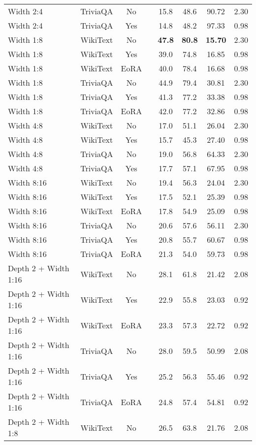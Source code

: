 \begin{longtable}{lcclcccc}
Width 2:4 & TriviaQA & No & & 15.8 & 48.6 & 90.72 & 2.30 \\
Width 2:4 & TriviaQA & Yes & & 14.8 & 48.2 & 97.33 & 0.98 \\
Width 1:8 & WikiText & No & & \textbf{47.8} & \textbf{80.8} & \textbf{15.70} & 2.30 \\
Width 1:8 & WikiText & Yes & & 39.0 & 74.8 & 16.85 & 0.98 \\
Width 1:8 & WikiText & EoRA & & 40.0 & 78.4 & 16.68 & 0.98 \\
Width 1:8 & TriviaQA & No & & 44.9 & 79.4 & 30.81 & 2.30 \\
Width 1:8 & TriviaQA & Yes & & 41.3 & 77.2 & 33.38 & 0.98 \\
Width 1:8 & TriviaQA & EoRA & & 42.0 & 77.2 & 32.86 & 0.98 \\
Width 4:8 & WikiText & No & & 17.0 & 51.1 & 26.04 & 2.30 \\
Width 4:8 & WikiText & Yes & & 15.7 & 45.3 & 27.40 & 0.98 \\
Width 4:8 & TriviaQA & No & & 19.0 & 56.8 & 64.33 & 2.30 \\
Width 4:8 & TriviaQA & Yes & & 17.7 & 57.1 & 67.95 & 0.98 \\
Width 8:16 & WikiText & No & & 19.4 & 56.3 & 24.04 & 2.30 \\
Width 8:16 & WikiText & Yes & & 17.5 & 52.1 & 25.39 & 0.98 \\
Width 8:16 & WikiText & EoRA & & 17.8 & 54.9 & 25.09 & 0.98 \\
Width 8:16 & TriviaQA & No & & 20.6 & 57.6 & 56.11 & 2.30 \\
Width 8:16 & TriviaQA & Yes & & 20.8 & 55.7 & 60.67 & 0.98 \\
Width 8:16 & TriviaQA & EoRA & & 21.3 & 54.0 & 59.73 & 0.98 \\
Depth 2 + Width 1:16 & WikiText & No & & 28.1 & 61.8 & 21.42 & 2.08 \\
Depth 2 + Width 1:16 & WikiText & Yes & & 22.9 & 55.8 & 23.03 & 0.92 \\
Depth 2 + Width 1:16 & WikiText & EoRA & & 23.3 & 57.3 & 22.72 & 0.92 \\
Depth 2 + Width 1:16 & TriviaQA & No & & 28.0 & 59.5 & 50.99 & 2.08 \\
Depth 2 + Width 1:16 & TriviaQA & Yes & & 25.2 & 56.3 & 55.46 & 0.92 \\
Depth 2 + Width 1:16 & TriviaQA & EoRA & & 24.8 & 57.4 & 54.81 & 0.92 \\
Depth 2 + Width 1:8 & WikiText & No & & 26.5 & 63.8 & 21.76 & 2.08 \\

\end{longtable}

